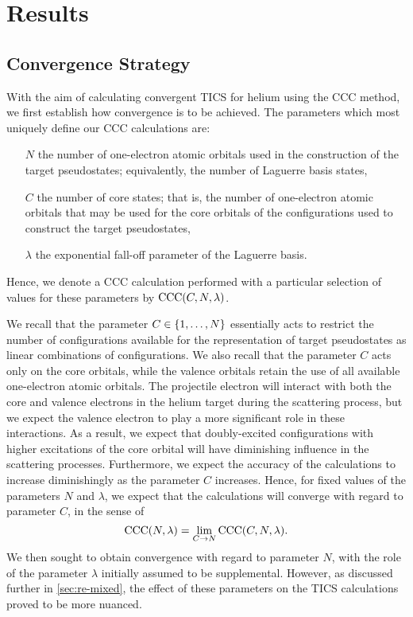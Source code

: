 \documentclass[]{article}
\begin{document}
\clearpage

\section{Results}
\label{sec:re}

\subsection{Convergence Strategy}
\label{sec:re-conv}

With the aim of calculating convergent TICS for helium using the CCC method,
we first establish how convergence is to be achieved.
The parameters which most uniquely define our CCC calculations are:
\begin{itemize}
\item[$N$]
  the number of one-electron atomic orbitals used in the construction of the
  target pseudostates; equivalently, the number of Laguerre basis states,
\item[$C$]
  the number of core states; that is, the number of one-electron atomic orbitals
  that may be used for the core orbitals of the configurations used to
  construct the target pseudostates,
\item[$\lambda$]
  the exponential fall-off parameter of the Laguerre basis.
\end{itemize}
Hence, we denote a CCC calculation performed with a particular selection of
values for these parameters by $\mathrm{CCC}(C, N, \lambda)$.

We recall that the parameter $C \in \lbrace1, \dotsc, N\rbrace$ essentially acts to
restrict the number of configurations available for the representation of target
pseudostates as linear combinations of configurations.
We also recall that the parameter $C$ acts only on the core orbitals, while the
valence orbitals retain the use of all available one-electron atomic orbitals.
The projectile electron will interact with both the core and valence electrons
in the helium target during the scattering process, but we expect the valence
electron to play a more significant role in these interactions.
As a result, we expect that doubly-excited configurations with higher
excitations of the core orbital will have diminishing influence in the
scattering processes.
Furthermore, we expect the accuracy of the calculations to increase
diminishingly as the parameter $C$ increases.
Hence, for fixed values of the parameters $N$ and $\lambda$, we expect that the
calculations will converge with regard to parameter $C$, in the sense of
\begin{equation*}
  \mathrm{CCC}(N, \lambda)
  =
  \lim_{C \to N}
  \mathrm{CCC}(C, N, \lambda)
  .
\end{equation*}
We then sought to obtain convergence with regard to parameter $N$, with the role
of the parameter $\lambda$ initially assumed to be supplemental.
However, as discussed further in \autoref{sec:re-mixed}, the effect of these
parameters on the TICS calculations proved to be more nuanced.
\end{document}
